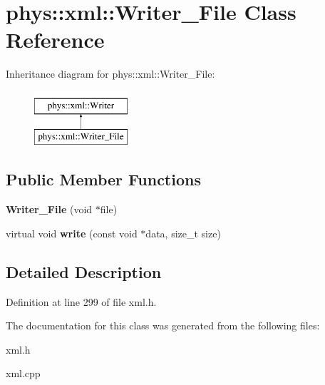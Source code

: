\hypertarget{classphys_1_1xml_1_1Writer__File}{
\section{phys::xml::Writer\_\-File Class Reference}
\label{dc/d64/classphys_1_1xml_1_1Writer__File}
}
Inheritance diagram for phys::xml::Writer\_\-File:\begin{figure}[H]
\begin{center}
\leavevmode
\includegraphics[height=2.000000cm]{dc/d64/classphys_1_1xml_1_1Writer__File}
\end{center}
\end{figure}
\subsection*{Public Member Functions}
\begin{DoxyCompactItemize}
\item 
\hypertarget{classphys_1_1xml_1_1Writer__File_aea4f4541d66392da7c5e75c35c8757b8}{
{\bfseries Writer\_\-File} (void $\ast$file)}
\label{dc/d64/classphys_1_1xml_1_1Writer__File_aea4f4541d66392da7c5e75c35c8757b8}

\item 
\hypertarget{classphys_1_1xml_1_1Writer__File_a615ef1a7a4a573b0e0ef12c6015302f7}{
virtual void {\bfseries write} (const void $\ast$data, size\_\-t size)}
\label{dc/d64/classphys_1_1xml_1_1Writer__File_a615ef1a7a4a573b0e0ef12c6015302f7}

\end{DoxyCompactItemize}


\subsection{Detailed Description}


Definition at line 299 of file xml.h.



The documentation for this class was generated from the following files:\begin{DoxyCompactItemize}
\item 
xml.h\item 
xml.cpp\end{DoxyCompactItemize}
